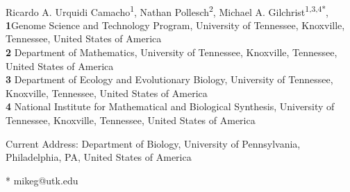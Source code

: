 \documentclass[10pt,letterpaper]{article}
\begin{document}
\vspace*{0.2in}
\begin{flushleft}
{\Large
\textbf{} %
}
\newline
\\
Ricardo A. Urquidi Camacho\textsuperscript{1\textcurrency},
Nathan Pollesch\textsuperscript{2},
Michael A. Gilchrist\textsuperscript{1,3,4*},
\\
\bigskip
\textbf{1}Genome Science and Technology Program, University of Tennessee, Knoxville, Tennessee, United States of America
\\
\textbf{2} Department of Mathematics, University of Tennessee,  Knoxville, Tennessee, United States of America
\\
\textbf{3} Department of Ecology and Evolutionary Biology, University of Tennessee, Knoxville, Tennessee, United States of America
\\
\textbf{4} National Institute for Mathematical and Biological Synthesis, University of Tennessee, Knoxville, Tennessee, United States of America
\\
\bigskip
% 

\textcurrency Current Address: Department of Biology, University of Pennsylvania, Philadelphia, PA, United States of America %

* mikeg@utk.edu

\end{flushleft}
\end{document}
